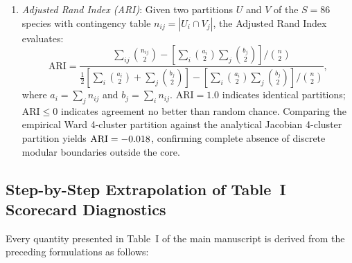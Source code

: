 \documentclass[11pt,a4paper]{article}
\begin{document}
\begin{enumerate}[label=(\alph*)]
\item \textit{Adjusted Rand Index (ARI)}: Given two partitions $U$ and $V$ of the $S = 86$ species with contingency table $n_{ij} = |U_i \cap V_j|$, the Adjusted Rand Index~\cite{hubert1985comparing} evaluates:
\begin{equation}
\mathrm{ARI} = \frac{\sum_{ij} \binom{n_{ij}}{2} - \left[ \sum_i \binom{a_i}{2} \sum_j \binom{b_j}{2} \right] / \binom{n}{2}}{\frac{1}{2} \left[ \sum_i \binom{a_i}{2} + \sum_j \binom{b_j}{2} \right] - \left[ \sum_i \binom{a_i}{2} \sum_j \binom{b_j}{2} \right] / \binom{n}{2}},
\end{equation}
where $a_i = \sum_j n_{ij}$ and $b_j = \sum_i n_{ij}$. $\mathrm{ARI} = 1.0$ indicates identical partitions; $\mathrm{ARI} \le 0$ indicates agreement no better than random chance. Comparing the empirical Ward 4-cluster partition against the analytical Jacobian 4-cluster partition yields $\mathrm{ARI} = -0.018$, confirming complete absence of discrete modular boundaries outside the core.
\end{enumerate}

\subsection{Step-by-Step Extrapolation of Table~I Scorecard Diagnostics}

Every quantity presented in Table~I of the main manuscript is derived from the preceding formulations as follows:
\end{document}
